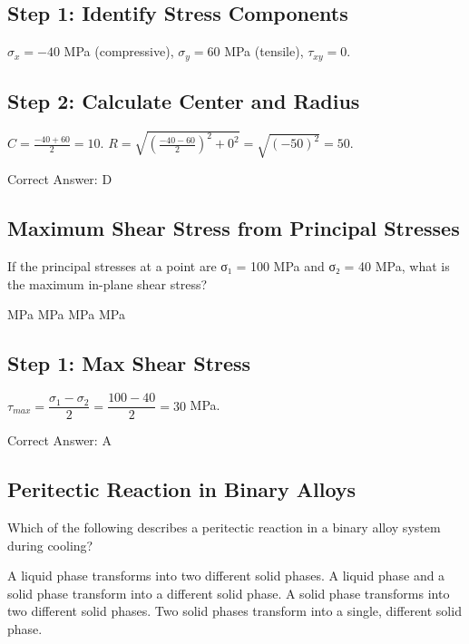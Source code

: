 \begin{solution}

\subsection*{Step 1: Identify Stress Components}
$\sigma_x = -40$ MPa (compressive), $\sigma_y = 60$ MPa (tensile), $\tau_{xy} = 0$.

\subsection*{Step 2: Calculate Center and Radius}
$C = \frac{-40 + 60}{2} = 10$. $R = \sqrt{(\frac{-40 - 60}{2})^2 + 0^2} = \sqrt{(-50)^2} = 50$.

Correct Answer: D
\end{solution}

\clearpage

\subsection{Maximum Shear Stress from Principal Stresses}

If the principal stresses at a point are σ₁ = 100 MPa and σ₂ = 40 MPa, what is the maximum in-plane shear stress?

\begin{choices}
     MPa
     MPa
     MPa
     MPa
\end{choices}

\begin{solution}

\subsection*{Step 1: Max Shear Stress}
$\tau_{max} = \dfrac{\sigma_1 - \sigma_2}{2} = \dfrac{100 - 40}{2} = 30$ MPa.

Correct Answer: A
\end{solution}

\clearpage

\subsection{Peritectic Reaction in Binary Alloys}

Which of the following describes a peritectic reaction in a binary alloy system during cooling?

\begin{choices}
    \choice A liquid phase transforms into two different solid phases.
    \correctchoice A liquid phase and a solid phase transform into a different solid phase.
    \choice A solid phase transforms into two different solid phases.
    \choice Two solid phases transform into a single, different solid phase.
\end{choices}

